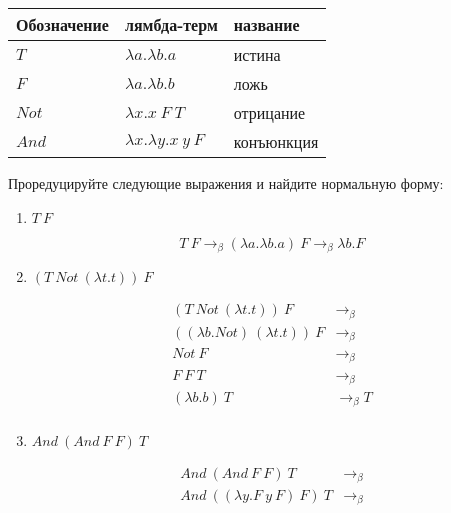 \begin{enumerate}
          \begin{tabular}{lll}
              Обозначение & лямбда-терм                   & название   \\\hline
              $T$         & $\lambda a.\lambda b.a$       & истина     \\
              $F$         & $\lambda a.\lambda b.b$       & ложь       \\
              $Not$       & $\lambda x.x\ F\ T$           & отрицание  \\
              $And$       & $\lambda x.\lambda y.x\ y\ F$ & конъюнкция
          \end{tabular}

          Проредуцируйте следующие выражения и найдите нормальную форму:

          \begin{enumerate}
              \item $T\ F$
                    \begin{solution}
                        \[T\ F \to_\beta (\lambda a.\lambda b.a)\ F \to_\beta \lambda b.F\]
                    \end{solution}
              \item $(T\ Not\ (\lambda t.t))\ F$
                    \begin{solution}
                        \begin{align*}
                            (T\ Not\ (\lambda t.t))\ F          & \to_\beta   \\
                            ((\lambda b.Not)\ (\lambda t.t))\ F & \to_\beta   \\
                            Not\ F                              & \to_\beta   \\
                            F\ F\ T                             & \to_\beta   \\
                            (\lambda b.b)\ T                    & \to_\beta T \\
                        \end{align*}
                    \end{solution}
              \item $And\ (And\ F\ F)\ T$
                    \begin{solution}
                        \begin{align*}
                            And\ (And\ F\ F)\ T                       & \to_\beta   \\
                            And\ ((\lambda y.F\ y\ F)\ F)\ T          & \to_\beta   \\

\end{align*}
\end{solution}
\end{enumerate}
\end{enumerate}
